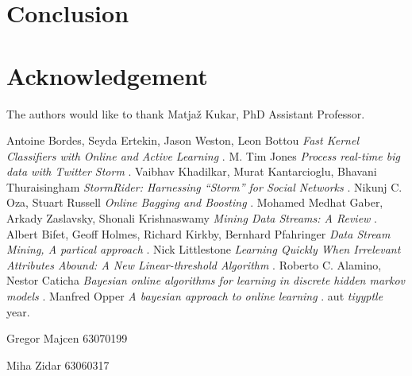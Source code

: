\documentclass[journal]{IEEEtran/IEEEtran}
\begin{document}
\section{Conclusion}



\appendices

\section*{Acknowledgement}
The authors would like to thank Matjaž Kukar, PhD Assistant Professor.


\begin{thebibliography}{1}
 Antoine Bordes, Seyda Ertekin, Jason Weston, Leon Bottou \emph{Fast Kernel Classifiers with Online and Active Learning} .
 M. Tim Jones \emph{Process real-time big data with Twitter Storm} .
 Vaibhav Khadilkar, Murat Kantarcioglu, Bhavani Thuraisingham \emph{StormRider: Harnessing “Storm” for Social Networks} \relax .
 Nikunj C. Oza, Stuart Russell \emph{Online Bagging and Boosting} \relax .
 Mohamed Medhat Gaber, Arkady Zaslavsky, Shonali Krishnaswamy \emph{Mining Data Streams: A Review} \relax .
 Albert Bifet, Geoff Holmes, Richard Kirkby, Bernhard Pfahringer \emph{Data Stream Mining, A partical approach } .
 Nick Littlestone \emph{Learning Quickly When Irrelevant Attributes Abound: A New Linear-threshold Algorithm } .
 Roberto C. Alamino, Nestor Caticha \emph{Bayesian online algorithms for learning in discrete hidden markov models} .
 Manfred Opper \emph{A bayesian approach to online learning} .
 aut \emph{tiyyptle } \relax year.

\end{thebibliography}

\newpage

\begin{IEEEbiography}{Gregor Majcen}
63070199
\end{IEEEbiography}

\begin{IEEEbiography}{Miha Zidar}
63060317
\end{IEEEbiography}
\end{document}
